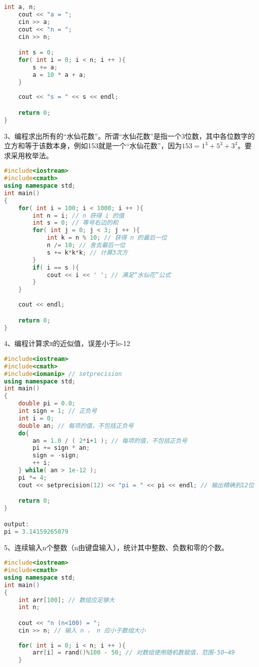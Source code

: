 \documentclass[14pt,aps,prb]{revtex4}
\begin{document}
\begin{spacing}{1.5}
\begin{lstlisting}[language=C++]
    int a, n;
    cout << "a = ";
    cin >> a;
    cout << "n = ";
    cin >> n;

    int s = 0;
    for( int i = 0; i < n; i ++ ){
        s += a;
        a = 10 * a + a;
    }
    
    cout << "s = " << s << endl;

    return 0;
}
\end{lstlisting}

3、编程求出所有的“水仙花数”。所谓“水仙花数”是指一个3位数，其中各位数字的立方和等于该数本身，例如153就是一个“水仙花数”，因为$153=1^3+5^3+3^3$。要求采用枚举法。
\begin{lstlisting}[language=C++]
#include<iostream>
#include<cmath>
using namespace std;
int main()
{
    for( int i = 100; i < 1000; i ++ ){
        int n = i; // n 获得 i 的值
        int s = 0; // 等号右边的和
        for( int j = 0; j < 3; j ++ ){
            int k = n % 10; // 获得 n 的最后一位
            n /= 10; // 舍去最后一位
            s += k*k*k; // 计算3次方
        }
        if( i == s ){
            cout << i << ' '; // 满足“水仙花”公式
        }
    }
    
    cout << endl;

    return 0;
}
\end{lstlisting}

4、编程计算求π的近似值，误差小于le-12
\begin{lstlisting}[language=C++]
#include<iostream>
#include<cmath>
#include<iomanip> // setprecision
using namespace std;
int main()
{
    double pi = 0.0; 
    int sign = 1; // 正负号
    int i = 0;
    double an; // 每项的值，不包括正负号
    do{
        an = 1.0 / ( 2*i+1 ); // 每项的值，不包括正负号
        pi += sign * an;
        sign = -sign;
        ++ i;
    } while( an > 1e-12 );
    pi *= 4;
    cout << setprecision(12) << "pi = " << pi << endl; // 输出精确到12位

    return 0;
}

output:
pi = 3.14159265079
\end{lstlisting}

5、连续输入n个整数（n由键盘输入），统计其中整数、负数和零的个数。
\begin{lstlisting}[language=C++]
#include<iostream>
#include<cmath>
using namespace std;
int main()
{
    int arr[100]; // 数组应足够大
    int n;

    cout << "n (n<100) = ";
    cin >> n; // 输入 n ， n 应小于数组大小
    
    for( int i = 0; i < n; i ++ ){
        arr[i] = rand()%100 - 50; // 对数组使用随机数赋值，范围-50~49
    }


\end{lstlisting}
\end{spacing}
\end{document}
